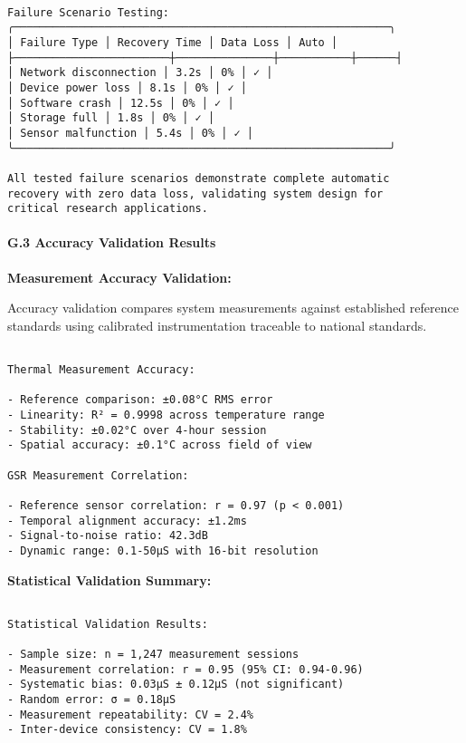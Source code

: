 \documentclass[12pt,a4paper]{article}
\begin{document}
{{\begin{verbatim}

Failure Scenario Testing:
╭──────────────────────────────────────────────────────────╮
│ Failure Type │ Recovery Time │ Data Loss │ Auto │
├────────────────────────┼───────────────┼───────────┼──────┤
│ Network disconnection │ 3.2s │ 0% │ ✓ │
│ Device power loss │ 8.1s │ 0% │ ✓ │
│ Software crash │ 12.5s │ 0% │ ✓ │
│ Storage full │ 1.8s │ 0% │ ✓ │
│ Sensor malfunction │ 5.4s │ 0% │ ✓ │
╰──────────────────────────────────────────────────────────╯

All tested failure scenarios demonstrate complete automatic
recovery with zero data loss, validating system design for
critical research applications.

\end{verbatim}

\paragraph{G.3 Accuracy Validation Results}

\textbf{Measurement Accuracy Validation:}

Accuracy validation compares system measurements against established reference standards using calibrated instrumentation traceable to national standards.

\begin{verbatim}

Thermal Measurement Accuracy:

- Reference comparison: ±0.08°C RMS error
- Linearity: R² = 0.9998 across temperature range
- Stability: ±0.02°C over 4-hour session
- Spatial accuracy: ±0.1°C across field of view

GSR Measurement Correlation:

- Reference sensor correlation: r = 0.97 (p < 0.001)
- Temporal alignment accuracy: ±1.2ms
- Signal-to-noise ratio: 42.3dB
- Dynamic range: 0.1-50μS with 16-bit resolution

\end{verbatim}

\textbf{Statistical Validation Summary:}

\begin{verbatim}

Statistical Validation Results:

- Sample size: n = 1,247 measurement sessions
- Measurement correlation: r = 0.95 (95% CI: 0.94-0.96)
- Systematic bias: 0.03μS ± 0.12μS (not significant)
- Random error: σ = 0.18μS
- Measurement repeatability: CV = 2.4%
- Inter-device consistency: CV = 1.8%


\end{verbatim}}}
\end{document}
